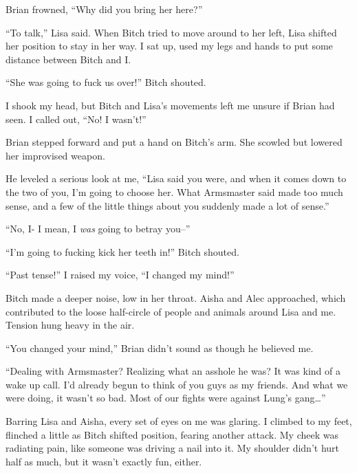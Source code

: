 Brian frowned, ``Why did you bring her here?''



``To talk,'' Lisa said.  When Bitch tried to move around to her left, Lisa shifted her position to stay in her way.  I sat up, used my legs and hands to put some distance between Bitch and I.



``She was going to fuck us over!'' Bitch shouted.



I shook my head, but Bitch and Lisa's movements left me unsure if Brian had seen.  I called out, ``No!  I wasn't!''



Brian stepped forward and put a hand on Bitch's arm.  She scowled but lowered her improvised weapon.



He leveled a serious look at me, ``Lisa said you were, and when it comes down to the two of you, I'm going to choose her.  What Armsmaster said made too much sense, and a few of the little things about you suddenly made a lot of sense.''



``No, I- I mean, I \emph{was }going to betray you--''



``I'm going to fucking kick her teeth in!'' Bitch shouted.



``Past tense!'' I raised my voice, ``I changed my mind!''



Bitch made a deeper noise, low in her throat.  Aisha and Alec approached, which contributed to the loose half-circle of people and animals  around Lisa and me.  Tension hung heavy in the air.



``You changed your mind,'' Brian didn't sound as though he believed me.



``Dealing with Armsmaster?  Realizing what an asshole he was?  It was kind of a wake up call.  I'd already begun to think of you guys as my friends.  And what we were doing, it wasn't so bad.  Most of our fights were against Lung's gang\ldots''



Barring Lisa and Aisha, every set of eyes on me was glaring.  I climbed to my feet, flinched a little as Bitch shifted position, fearing another attack.  My cheek was radiating pain, like someone was driving a nail into it.  My shoulder didn't hurt half as much, but it wasn't exactly fun, either.



